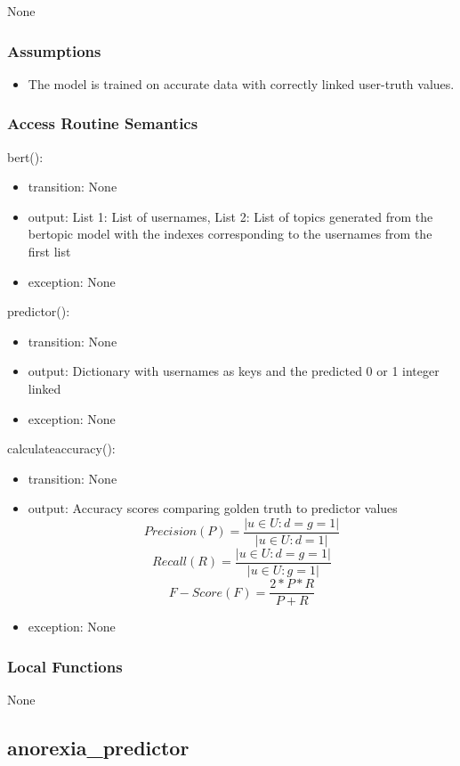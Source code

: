 \documentclass[12pt, titlepage]{article}
\begin{document}
None

\subsubsection{Assumptions}

\begin{itemize}
\item The model is trained on accurate data with correctly linked user-truth values.
\end{itemize}

\subsubsection{Access Routine Semantics}

\noindent bert():
\begin{itemize}
\item transition: None
\item output: List 1: List of usernames, List 2: List of topics generated from the bertopic model with the indexes corresponding to the usernames from the first list
\item exception: None
\end{itemize}

\noindent predictor():
\begin{itemize}
\item transition: None
\item output: Dictionary with usernames as keys and the predicted 0 or 1 integer linked
\item exception: None
\end{itemize}

\noindent calculateaccuracy():
\begin{itemize}
\item transition: None
\item output: Accuracy scores comparing golden truth to predictor values
\[ Precision (P) = \frac{|u \in U: d = g = 1|}{|u \in U: d = 1|} \]
\[ Recall (R) = \frac{|u \in U: d = g = 1|}{|u \in U: g = 1|} \]
\[ F-Score (F) = \frac{2*P*R}{P+R} \]
\item exception: None
\end{itemize}

\subsubsection{Local Functions}

None

\subsection{anorexia\_predictor}
\end{document}
